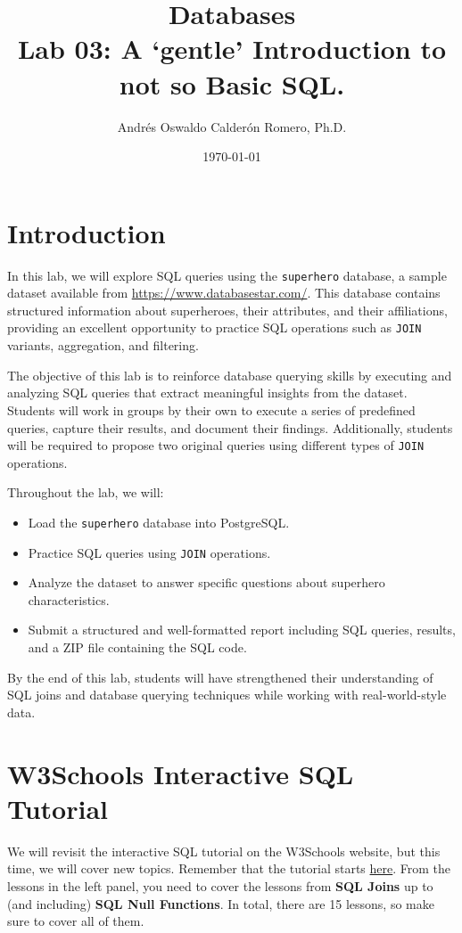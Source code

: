 \documentclass{article}
\title{Databases \\ Lab 03: A `gentle' Introduction to not so Basic SQL.}
\author{Andrés Oswaldo Calderón Romero, Ph.D.}
\date{\today}
\begin{document}
\maketitle

\section{Introduction}

In this lab, we will explore SQL queries using the \texttt{superhero} database, a sample dataset available from \url{https://www.databasestar.com/}. This database contains structured information about superheroes, their attributes, and their affiliations, providing an excellent opportunity to practice SQL operations such as \texttt{JOIN} variants, aggregation, and filtering.

The objective of this lab is to reinforce database querying skills by executing and analyzing SQL queries that extract meaningful insights from the dataset. Students will work in groups by their own to execute a series of predefined queries, capture their results, and document their findings. Additionally, students will be required to propose two original queries using different types of \texttt{JOIN} operations.

Throughout the lab, we will:
\begin{itemize}
    \item Load the \texttt{superhero} database into PostgreSQL.
    \item Practice SQL queries using \texttt{JOIN} operations.
    \item Analyze the dataset to answer specific questions about superhero characteristics.
    \item Submit a structured and well-formatted report including SQL queries, results, and a ZIP file containing the SQL code.
\end{itemize}

By the end of this lab, students will have strengthened their understanding of SQL joins and database querying techniques while working with real-world-style data.

\section{W3Schools Interactive SQL Tutorial}

We will revisit the interactive SQL tutorial on the W3Schools website, but this time, we will cover new topics. Remember that the tutorial starts \href{https://www.w3schools.com/sql/}{here}. From the lessons in the left panel, you need to cover the lessons from \textbf{SQL Joins} up to (and including) \textbf{SQL Null Functions}. In total, there are 15 lessons, so make sure to cover all of them.
\end{document}
